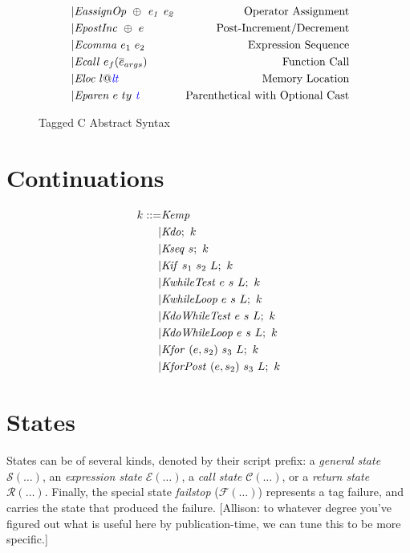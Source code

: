 \documentclass{llncs}
\begin{document}
\begin{figure}
\begin{subfigure}[t]{0.69\textwidth}
\[\begin{aligned}
    | & \mathit{EassignOp ~ \oplus ~ e_1 ~ e_2} & \textnormal{Operator Assignment} \\
    | & \mathit{EpostInc} ~ \oplus ~ e & \textnormal{Post-Increment/Decrement} \\
    | & \mathit{Ecomma} ~ e_1 ~ e_2 & \textnormal{Expression Sequence} \\
    | & \mathit{Ecall} ~ e_f(\overline{e}_{args}) & \textnormal{Function Call} \\
    | & \mathit{Eloc} ~ l@\mathit{\color{blue} lt} & \textnormal{Memory Location} \\
    | & \mathit{Eparen} ~ e ~ ty ~ \mathit{\color{blue} t} & \textnormal{Parenthetical with Optional Cast} \\
    \end{aligned}\]
  \end{subfigure}
  \caption{Tagged C Abstract Syntax}
  \label{fig:syntax}
\end{figure}

\section{Continuations}
\label{app:continuations}

\[\begin{split}
k ::= & \mathit{Kemp} \\
| & \mathit{Kdo};~ k \\
| & \mathit{Kseq} ~ s; ~ k \\
| & \mathit{Kif} ~ s_1 ~ s_2 ~ L; ~ k \\
| & \mathit{KwhileTest} ~ e ~ s ~ L; ~ k \\
| & \mathit{KwhileLoop} ~ e ~ s ~ L; ~ k \\
| & \mathit{KdoWhileTest} ~ e ~ s ~ L; ~ k \\
| & \mathit{KdoWhileLoop} ~ e ~ s ~ L; ~ k \\
| & \mathit{Kfor} ~ (e,s_2) ~ s_3 ~ L ; ~ k \\
| & \mathit{KforPost} ~ (e,s_2) ~ s_3 ~ L ; ~ k \\
\end{split}\]

\section{States}

States can be of several kinds, denoted by their script prefix: a {\em general state} \(\mathcal{S}(\dots)\),
an {\em expression state} \(\mathcal{E}(\dots)\), a {\em call state} \(\mathcal{C}(\dots)\), or a
{\em return state} \(\mathcal{R}(\dots)\). Finally, the special state {\em failstop} (\(\mathcal{F}(\dots)\))
represents a tag failure, and carries the state that produced the failure.
[Allison: to whatever degree you've figured out what is useful here by publication-time, we can
  tune this to be more specific.]
\end{document}
